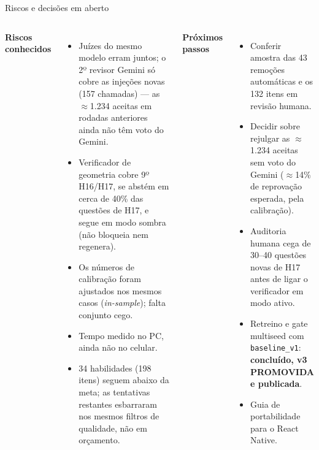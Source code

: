 \documentclass[aspectratio=169,11pt]{beamer}
\newcommand{\okmark}{{\color{okgreen}\faCheckCircle}}
\newcommand{\warnmark}{{\color{warnorange}\faExclamationTriangle}}
\begin{document}
\begin{frame}{Riscos e decisões em aberto}
  \small
  \begin{columns}[T]
    \textbf{Riscos conhecidos}
    \begin{itemize}\setlength\itemsep{3pt}
      \item[\warnmark] Juízes do mesmo modelo erram juntos; o 2º revisor Gemini só cobre as injeções novas (157 chamadas) --- as $\approx$1.234 aceitas em rodadas anteriores ainda não têm voto do Gemini.
      \item[\warnmark] Verificador de geometria cobre 9º H16/H17, se abstém em cerca de 40\% das questões de H17, e segue em modo sombra (não bloqueia nem regenera).
      \item[\warnmark] Os números de calibração foram ajustados nos mesmos casos (\emph{in-sample}); falta conjunto cego.
      \item[\warnmark] Tempo medido no PC, ainda não no celular.
      \item[\warnmark] 34 habilidades (198 itens) seguem abaixo da meta; as tentativas restantes esbarraram nos mesmos filtros de qualidade, não em orçamento.
    \end{itemize}
    \textbf{Próximos passos}
    \begin{itemize}\setlength\itemsep{3pt}
      \item[\faCheckSquare] Conferir amostra das 43 remoções automáticas e os 132 itens em revisão humana.
      \item[\faCheckSquare] Decidir sobre rejulgar as $\approx$1.234 aceitas sem voto do Gemini ($\approx$14\% de reprovação esperada, pela calibração).
      \item[\faCheckSquare] Auditoria humana cega de 30--40 questões novas de H17 antes de ligar o verificador em modo ativo.
      \item[\okmark] Retreino e gate multiseed com \texttt{baseline\_v1}: \textbf{concluído, v3 PROMOVIDA e publicada}.
      \item[\faCheckSquare] Guia de portabilidade para o React Native.
    \end{itemize}
  \end{columns}
\end{frame}
\end{document}
